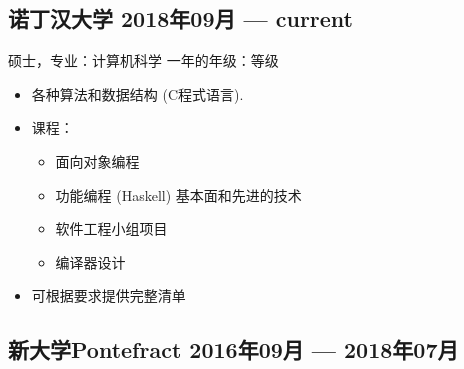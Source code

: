 \documentclass[10pt]{extarticle}
\begin{document}
        \subsection{诺丁汉大学 %
        \hfill 2018年09月 --- current}
        硕士，专业：计算机科学
        \hfill
        一年的年级：等级\\
        {}
        \begin{itemize}
            \item 各种算法和数据结构 (C程式语言).
            \item 课程：
                \begin{itemize}
                    \item 面向对象编程
                    \item 功能编程 (Haskell) \textendash{} 基本面和先进的技术
                    \item 软件工程小组项目
                    \item 编译器设计
                \end{itemize}
            \item 可根据要求提供完整清单
        \end{itemize}
        \subsection{新大学Pontefract %
            \hfill 2016年09月 --- 2018年07月}
\end{document}
